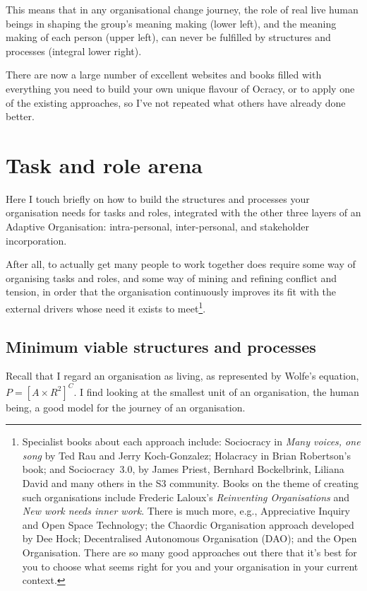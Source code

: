 This means that in any organisational change journey, the role of real live human beings in shaping the group's meaning making (lower left), and the meaning making of each person (upper left), can never be fulfilled by structures and processes (integral lower right). 


There are now a large number of excellent websites and books filled with everything you need to build your own unique flavour of Ocracy,  or to apply one of the existing approaches, so I’ve not repeated what others have already done better. 






\section{Task and role arena}
Here I touch briefly on how to build the structures and processes your organisation needs for tasks and roles, integrated with the other three layers of an Adaptive Organisation:  intra-personal, inter-personal, and stakeholder incorporation. 


After all, to actually get many people to work together does require some way of organising tasks and roles, and some way of mining and refining conflict and tension, in order that the organisation continuously improves its fit with the external drivers whose need it exists to meet\footnote{
Specialist books about each approach include: Sociocracy in \emph{Many voices, one song}\cite{rau-sociocracy} by Ted Rau and Jerry Koch-Gonzalez; Holacracy in Brian Robertson’s\cite{robertson-holacracy} book; and Sociocracy~3.0, \cite{priest-s3-web} by James Priest, Bernhard Bockelbrink, Liliana David and many others in the S3 community\cite{cumps-sociocratie}. Books on the theme of creating such organisations include Frederic Laloux's \emph{Reinventing Organisations}\cite{laloux-RO,laloux-illustrated} and \emph{New work needs inner work}\cite{breidenbach-new}. There is much more, e.g., Appreciative Inquiry and Open Space Technology; the Chaordic Organisation approach developed by Dee Hock; Decentralised Autonomous Organisation (DAO); and the Open Organisation. There are so many good approaches out there that it's best for you to choose what seems right for you and your organisation in your current context.
}.  




\subsection{Minimum viable structures and processes}
Recall that I regard an organisation as living, as represented by Wolfe’s  equation, $P = [ A \times R^{2} ]^C$. I find looking at the smallest unit of an organisation, the human being, a good model for the journey of an organisation.


